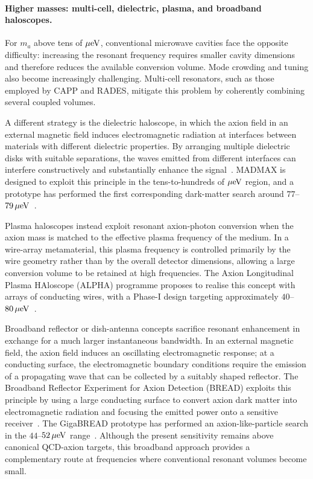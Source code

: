 \documentclass[review]{elsarticle}
\numberwithin{equation}{section}
\numberwithin{table}{section}
\numberwithin{figure}{section}
\begin{document}
\paragraph{Higher masses: multi-cell, dielectric, plasma, and broadband haloscopes.}

For $m_a$ above tens of $\mu{\rm eV}$, conventional microwave cavities face the opposite difficulty: increasing the resonant frequency requires smaller cavity dimensions and therefore reduces the available conversion volume. Mode crowding and tuning also become increasingly challenging. Multi-cell resonators, such as those employed by CAPP and RADES, mitigate this problem by coherently combining several coupled volumes.

A different strategy is the dielectric haloscope, in which the axion field in an external magnetic field induces electromagnetic radiation at interfaces between materials with different dielectric properties. By arranging multiple dielectric disks with suitable separations, the waves emitted from different interfaces can interfere constructively and substantially enhance the signal~\cite{Caldwell:2016dcw}. MADMAX is designed to exploit this principle in the tens-to-hundreds of $\mu{\rm eV}$ region, and a prototype has performed the first corresponding dark-matter search around $77$--$79\,\mu{\rm eV}$~\cite{MADMAX:2024sxs}.

Plasma haloscopes instead exploit resonant axion-photon conversion when the axion mass is matched to the effective plasma frequency of the medium. In a wire-array metamaterial, this plasma frequency is controlled primarily by the wire geometry rather than by the overall detector dimensions, allowing a large conversion volume to be retained at high frequencies. The Axion Longitudinal Plasma HAloscope (ALPHA) programme proposes to realise this concept with arrays of conducting wires, with a Phase-I design targeting approximately $40$--$80\,\mu{\rm eV}$~\cite{ALPHA:2022rxj,ALPHA:2026vwc}.

Broadband reflector or dish-antenna concepts sacrifice resonant enhancement in exchange for a much larger instantaneous bandwidth. In an external magnetic field, the axion field induces an oscillating electromagnetic response; at a conducting surface, the electromagnetic boundary conditions require the emission of a propagating wave that can be collected by a suitably shaped reflector. The Broadband Reflector Experiment for Axion Detection (BREAD) exploits this principle by using a large conducting surface to convert axion dark matter into electromagnetic radiation and focusing the emitted power onto a sensitive receiver~\cite{BREAD:2021tpx}. The GigaBREAD prototype has performed an axion-like-particle search in the $44$--$52\,\mu{\rm eV}$ range~\cite{GigaBREAD:2025lzq}. Although the present sensitivity remains above canonical QCD-axion targets, this broadband approach provides a complementary route at frequencies where conventional resonant volumes become small.
\end{document}
